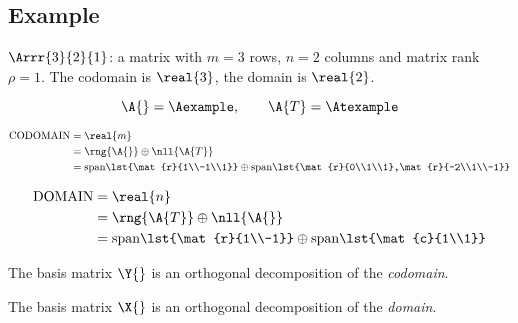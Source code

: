 \subsection{Example}
 $\Arrr{3}{2}{1}$: a matrix with $m=3$ rows, $n=2$ columns and matrix rank $\rho=1$. The codomain is $\real{3}$, the domain is $\real{2}$.

\begin{equation*}
  \A{} = \Aexample, \qquad \A{T} = \Atexample
\end{equation*}

\begin{equation*}
  \begin{split}
    \text{CODOMAIN} &=\real{m} \\
      &= \rng{\A{}} \oplus \nll{\A{T}}\\
      &= \text{span}\lst{\mat{r}{1\\-1\\1}} \oplus \text{span}\lst{\mat{r}{0\\1\\1},\mat{r}{-2\\1\\-1}}\\
  \end{split}
\end{equation*}

\begin{equation*}
  \begin{split}
    \text{DOMAIN} &=\real{n} \\
      &= \rng{\A{T}} \oplus \nll{\A{}}\\
      &= \text{span}\lst{\mat{r}{1\\-1}} \oplus \text{span}\lst{\mat{c}{1\\1}}\\
  \end{split}
\end{equation*}

The basis matrix $\Y{}$ is an orthogonal decomposition of the \textit{codomain}.

The basis matrix $\X{}$ is an orthogonal decomposition of the \textit{domain}.

